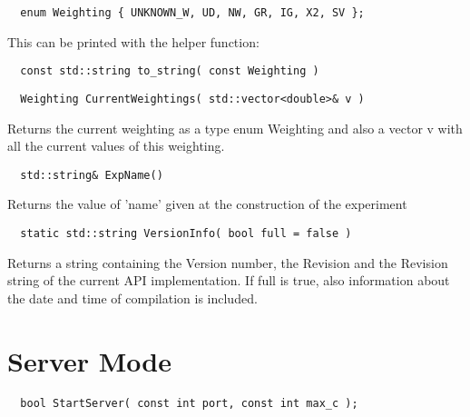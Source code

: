 \documentclass{report}
\begin{document}
\begin{footnotesize}
\begin{verbatim}
  enum Weighting { UNKNOWN_W, UD, NW, GR, IG, X2, SV };
\end{verbatim}
\end{footnotesize}

This can be printed with the helper function: 

\begin{footnotesize}
\begin{verbatim}
  const std::string to_string( const Weighting )
\end{verbatim}
\end{footnotesize}


\begin{footnotesize}
\begin{verbatim}
  Weighting CurrentWeightings( std::vector<double>& v )
\end{verbatim}
\end{footnotesize}

Returns the current weighting as a type enum Weighting and also a
vector v with all the current values of this weighting.

\begin{footnotesize}
\begin{verbatim}
  std::string& ExpName()
\end{verbatim}
\end{footnotesize}

Returns the value of 'name' given at the construction of the experiment

\begin{footnotesize}
\begin{verbatim}
  static std::string VersionInfo( bool full = false )
\end{verbatim}
\end{footnotesize}

Returns a string containing the Version number, the Revision and the
Revision string of the current API implementation. If full is true,
also information about the date and time of compilation is included.

\chapter{Server Mode}
\label{Using TiMBL as a Server}

\begin{footnotesize}
\begin{verbatim}
  bool StartServer( const int port, const int max_c );
\end{verbatim}
\end{footnotesize}
\end{document}

